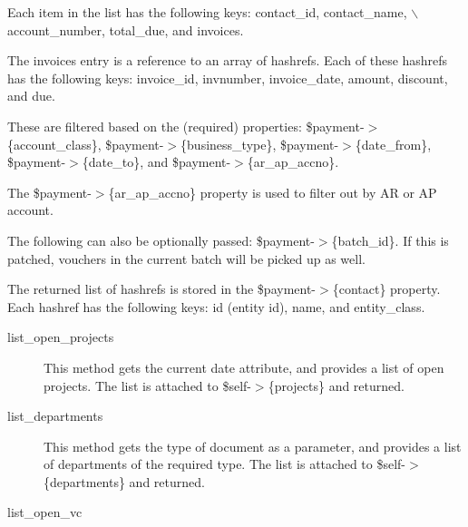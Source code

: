 \begin{description}
\begin{description}
\begin{description}
\begin{description}
\begin{description}
\begin{description}
\begin{description}
\begin{description}
\begin{description}
\begin{description}
Each item in the list has the following keys: contact\_id, contact\_name, $\backslash$
account\_number, total\_due, and invoices.



The invoices entry is a reference to an array of hashrefs.  Each of these 
hashrefs has the following keys: invoice\_id, invnumber, invoice\_date, amount, 
discount, and due.



These are filtered based on the (required) properties:
\$payment-$>$\{account\_class\}, \$payment-$>$\{business\_type\}, \$payment-$>$\{date\_from\},
\$payment-$>$\{date\_to\}, and \$payment-$>$\{ar\_ap\_accno\}.



The \$payment-$>$\{ar\_ap\_accno\} property is used to filter out by AR or AP account.



The following can also be optionally passed: \$payment-$>$\{batch\_id\}.  If this is 
patched, vouchers in the current batch will be picked up as well.



The returned list of hashrefs is stored in the \$payment-$>$\{contact\} property.
Each hashref has the following keys:  id (entity id), name, and entity\_class.

\end{description}
\begin{description}

\item[{list\_open\_projects}] \mbox{}

This method gets the current date attribute, and provides a list of open
projects.  The list is attached to \$self-$>$\{projects\} and returned.

\end{description}
\begin{description}

\item[{list\_departments}] \mbox{}

This method gets the type of document as a parameter, and provides a list of departments
of the required type.
The list is attached to \$self-$>$\{departments\} and returned.

\end{description}
\begin{description}

\item[{list\_open\_vc}] \mbox{}


\end{description}
\end{description}
\end{description}
\end{description}
\end{description}
\end{description}
\end{description}
\end{description}
\end{description}
\end{description}
